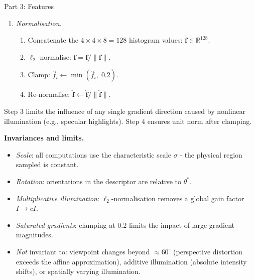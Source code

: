 \documentclass[letterpaper]{article}
\begin{document}
\begin{notes}{Part 3: Features}
\begin{enumerate}
\begin{enumerate}
        \item \emph{Normalisation.}
        \begin{enumerate}
            \item Concatenate the $4\times4\times8 = 128$ histogram values: $\mathbf{f} \in \mathbb{R}^{128}$.
            \item $\ell_2$-normalise: $\hat{\mathbf{f}} = \mathbf{f}/\|\mathbf{f}\|$.
            \item Clamp: $\hat{f}_i \leftarrow \min(\hat{f}_i,\; 0.2)$.
            \item Re-normalise: $\hat{\mathbf{f}} \leftarrow \hat{\mathbf{f}}/\|\hat{\mathbf{f}}\|$.
        \end{enumerate}
    \end{enumerate}
    

    Step 3 limits the influence of any single gradient direction caused by nonlinear illumination (e.g., specular highlights). Step 4 ensures unit norm after clamping.
\end{enumerate}






\textbf{Invariances and limits.}
\begin{itemize}
    \item \emph{Scale}: all computations use the characteristic scale $\sigma$ - the physical region sampled is constant.
    \item \emph{Rotation}: orientations in the descriptor are relative to $\theta^*$.
    \item \emph{Multiplicative illumination}: $\ell_2$-normalisation removes a global gain factor $I \to cI$.
    \item \emph{Saturated gradients}: clamping at 0.2 limits the impact of large gradient magnitudes.
    \item \emph{Not} invariant to: viewpoint changes beyond $\approx60^\circ$ (perspective distortion exceeds the affine approximation), additive illumination (absolute intensity shifts), or spatially varying illumination.
\end{itemize}


\end{notes}
\end{document}
